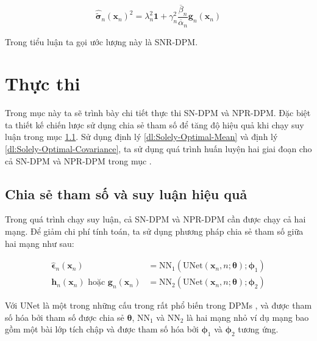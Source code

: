 \documentclass[14pt, a4paper]{article}
\numberwithin{equation}{section}
\numberwithin{figure}{section}
\numberwithin{dl}{section}
\numberwithin{md}{section}
\numberwithin{bd}{section}
\numberwithin{dn}{section}
\numberwithin{hq}{section}
\begin{document}
    \begin{equation} \label{eq:Sigma-NPR-DPM}
        \hat{\tilde{\boldsymbol{\sigma}}}_n (\boldsymbol{x}_n)^2 = \lambda_n^2 \boldsymbol{1} + \gamma_n^2 \dfrac{\overline{\beta}_n}{\overline{\alpha}_n} \boldsymbol{g}_n (\boldsymbol{x}_n)
    \end{equation}

    Trong tiểu luận ta gọi ước lượng này là SNR-DPM.

    \section{Thực thi} \label{Implementation}

    Trong mục này ta sẽ trình bày chi tiết thực thi SN-DPM và NPR-DPM.
    Đặc biệt ta thiết kế chiến lược sử dụng chia sẻ tham số để tăng độ hiệu quả khi chạy suy luận trong mục \ref{Parameter-Sharing-And-Inference-Efficiency}.
    Sử dụng định lý \ref{dl:Solely-Optimal-Mean} và định lý \ref{dl:Solely-Optimal-Covariance}, ta sử dụng quá trình huấn luyện hai giai đoạn cho cả SN-DPM và NPR-DPM trong mục .

    \subsection{Chia sẻ tham số và suy luận hiệu quả} \label{Parameter-Sharing-And-Inference-Efficiency}

    Trong quá trình chạy suy luận, cả SN-DPM và NPR-DPM cần được chạy cả hai mạng.
    Để giảm chi phí tính toán, ta sử dụng phương pháp chia sẻ tham số giữa hai mạng như sau:

    \begin{equation} \label{eq:Parameter-Sharing-Scheme}
        \begin{aligned}
        \hat{\boldsymbol{\epsilon}}_n (\boldsymbol{x}_n) &= \mathrm{NN}_1 (\mathrm{UNet}(\boldsymbol{x}_n, n ; \boldsymbol{\theta}); \boldsymbol{\phi}_1) \\
        \boldsymbol{h}_n (\boldsymbol{x}_n) \text{ hoặc } \boldsymbol{g}_n (\boldsymbol{x}_n) &= \mathrm{NN}_2(\mathrm{UNet}(\boldsymbol{x}_n, n; \boldsymbol{\theta}); \boldsymbol{\phi}_2)
        \end{aligned}
    \end{equation}

    Với $\mathrm{UNet}$ là một trong những cấu trong rất phổ biến trong DPMs \cite{ho2020denoising}, \cite{song2020score} và được tham số hóa bởi tham số được chia sẻ $\boldsymbol{\theta}$,
    $\mathrm{NN}_1$ và $\mathrm{NN}_2$ là hai mạng nhỏ ví dụ mạng bao gồm một bài lớp tích chập và được tham số hóa bởi $\boldsymbol{\phi}_1$ và $\boldsymbol{\phi}_2$ tương ứng.
\end{document}
